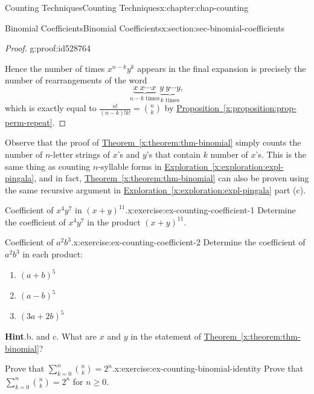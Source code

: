 \documentclass[oneside,10pt,]{book}
\newcommand{\blocktitlefont}{\relax}
\newcommand{\xreffont}{\relax}
\numberwithin{equation}{section}
\begin{document}
\begin{chapterptx}{Counting Techniques}{}{Counting Techniques}{}{}{x:chapter:chap-counting}
\begin{sectionptx}{Binomial Coefficients}{}{Binomial Coefficients}{}{}{x:section:sec-binomial-coefficients}
\begin{proof}{}{g:proof:id528764}
\par
Hence the number of times \(x^{n-k}y^k\) appears in the final expansion is precisely the number of rearrangements of the word%
\begin{equation*}
\underbrace{x\ x\cdots x}_\text{$n-k$ times}\underbrace{y\ y\cdots y}_\text{$k$ times},
\end{equation*}
which is exactly equal to \(\frac{n!}{(n-k)!k!} = \binom{n}{k}\) by \hyperref[x:proposition:prop-perm-repeat]{Proposition~{\xreffont\ref{x:proposition:prop-perm-repeat}}}.%
\end{proof}
Observe that the proof of \hyperref[x:theorem:thm-binomial]{Theorem~{\xreffont\ref{x:theorem:thm-binomial}}} simply counts the number of \(n\)-letter strings of \(x\)'s and \(y\)'s that contain \(k\) number of \(x\)'s. This is the same thing as counting \(n\)-syllable forms in \hyperref[x:exploration:expl-pingala]{Exploration~{\xreffont\ref{x:exploration:expl-pingala}}}, and in fact, \hyperref[x:theorem:thm-binomial]{Theorem~{\xreffont\ref{x:theorem:thm-binomial}}} can also be proven using the same recursive argument in \hyperref[x:exploration:expl-pingala]{Exploration~{\xreffont\ref{x:exploration:expl-pingala}}} part (c).%
\begin{inlineexercise}{Coefficient of \(x^4y^7\) in \((x+y)^{11}\).}{x:exercise:ex-counting-coefficient-1}%
Determine the coefficient of \(x^4y^7\) in the product \((x+y)^{11}\).%
\end{inlineexercise}%
\begin{inlineexercise}{Coefficient of \(a^2b^3\).}{x:exercise:ex-counting-coefficient-2}%
Determine the coefficient of \(a^2b^3\) in each product:%
\begin{enumerate}[label=(\alph*)]
\item{}\(\displaystyle (a+b)^5\)%
\item{}\(\displaystyle (a-b)^5\)%
\item{}\(\displaystyle (3a+2b)^5\)%
\end{enumerate}
%
\par\smallskip%
\noindent\textbf{\blocktitlefont Hint}.\hypertarget{g:hint:id528923}{}\quad{}b. and c. What are \(x\) and \(y\) in the statement of \hyperref[x:theorem:thm-binomial]{Theorem~{\xreffont\ref{x:theorem:thm-binomial}}}?%
\end{inlineexercise}%
\begin{inlineexercise}{Prove that \(\displaystyle\sum_{k=0}^n \binom{n}{k} = 2^n\).}{x:exercise:ex-counting-binomial-identity}%
Prove that \(\displaystyle\sum_{k=0}^n \binom{n}{k} = 2^n\) for \(n \geq 0\).%

\end{inlineexercise}
\end{sectionptx}
\end{chapterptx}
\end{document}
